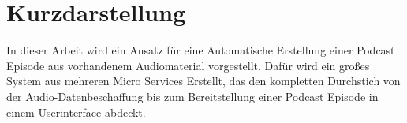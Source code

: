\thispagestyle{empty}
\section*{Kurzdarstellung}
\label{sec:kurzdarstellung}
In dieser Arbeit wird ein Ansatz für eine Automatische Erstellung einer Podcast Episode aus vorhandenem Audiomaterial vorgestellt.
Dafür wird ein großes System aus mehreren Micro Services Erstellt, das den kompletten Durchstich von der Audio-Datenbeschaffung bis zum Bereitstellung einer Podcast Episode in einem Userinterface abdeckt.






